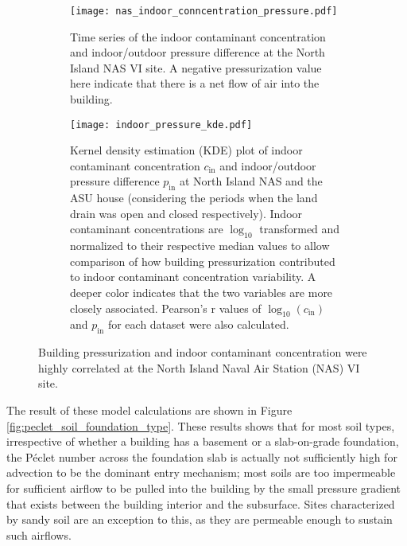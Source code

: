 \begin{figure}[htb!]
  \centering
  \begin{subfigure}{0.75\textwidth}
    \centering
    \texttt{[image: nas\_indoor\_conncentration\_pressure.pdf]}
    \caption[Time series of the indoor contaminant concentration and indoor/outdoor pressure difference at the North Island NAS VI site.]{Time series of the indoor contaminant concentration and indoor/outdoor pressure difference at the North Island NAS VI site. A negative pressurization value here indicate that there is a net flow of air into the building.}
  \end{subfigure}
  \begin{subfigure}{0.75\textwidth}
    \centering
    \texttt{[image: indoor\_pressure\_kde.pdf]}
    \caption[KDE plot comparing indoor contaminant concentration and indoor/outdoor pressure difference at North Island NAS and the ASU house.]{Kernel density estimation (KDE) plot of indoor contaminant concentration $c_\mathrm{in}$ and indoor/outdoor pressure difference $p_\mathrm{in}$ at North Island NAS and the ASU house (considering the periods when the land drain was open and closed respectively). Indoor contaminant concentrations are $\log_{10}$ transformed and normalized to their respective median values to allow comparison of how building pressurization contributed to indoor contaminant concentration variability. A deeper color indicates that the two variables are more closely associated. Pearson's r values of $\log_{10}(c_\mathrm{in})$ and $p_\mathrm{in}$ for each dataset were also calculated.}
  \end{subfigure}
  \caption{Building pressurization and indoor contaminant concentration were highly correlated at the North Island Naval Air Station (NAS) VI site.}
  \label{fig:north_island}
\end{figure}

The result of these model calculations are shown in Figure \ref{fig:peclet_soil_foundation_type}.
These results shows that for most soil types, irrespective of whether a building has a basement or a slab-on-grade foundation, the Péclet number across the foundation slab is actually not sufficiently high for advection to be the dominant entry mechanism; most soils are too impermeable for sufficient airflow to be pulled into the building by the small pressure gradient that exists between the building interior and the subsurface.
Sites characterized by sandy soil are an exception to this, as they are permeable enough to sustain such airflows.\par

